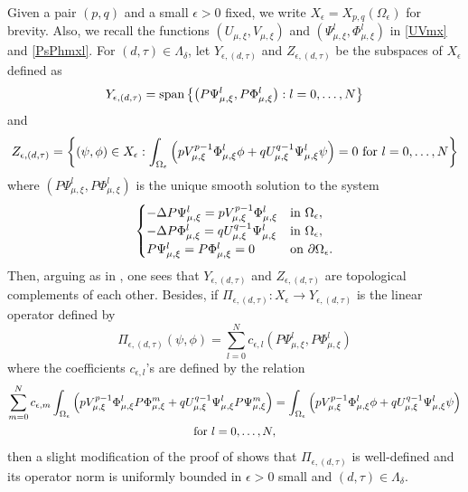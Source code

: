 \documentclass[reqno]{amsart}
\theoremstyle{remark}
\newcommand{\pa}{\partial}
\newcommand{\ep}{\epsilon}
\newcommand{\mx}{{\mu,\xi}}
\renewcommand{\(}{\left(}
\renewcommand{\)}{\right)}
\numberwithin{equation}{section}
\begin{document}
Given a pair $(p,q)$ and a small $\ep > 0$ fixed, we write $X_\ep = X_{p,q}(\Omega_{\ep})$ for brevity.
Also, we recall the functions $(U_\mx,V_\mx)$ and $(\Psi_\mx^l,\Phi_\mx^l)$ in \eqref{UVmx} and \eqref{PsPhmxl}.
For $(d,\tau) \in \Lambda_\delta$, let $Y_{\ep,(d,\tau)}$ and $Z_{\ep,(d,\tau)}$ be the subspaces of $X_\ep$ defined as
\[Y_{\ep,(d,\tau)} = \textup{span} \left\{\(P\Psi_\mx^l,P\Phi_\mx^l\): l = 0, \ldots, N \right\}\]
and
\[Z_{\ep,(d,\tau)} = \left\{(\psi,\phi) \in X_\ep: \int_{\Omega_\ep} \(p V_\mx^{p-1} \Phi_\mx^l \phi + q U_\mx^{q-1} \Psi_\mx^l \psi\) = 0 \textup{ for } l = 0, \ldots, N \right\}\]
where $(P\Psi_\mx^l,P\Phi_\mx^l)$ is the unique smooth solution to the system
\begin{equation}\label{PPsPPhmxl eq}
\begin{cases}
-\Delta P\Psi_\mx^l = pV_\mx^{p-1}\Phi_\mx^l &\textup{in } \Omega_\ep,\\
-\Delta P\Phi_\mx^l = qU_\mx^{q-1}\Psi_\mx^l &\textup{in } \Omega_\ep,\\
P\Psi_\mx^l = P\Phi_\mx^l = 0 &\textup{on } \pa \Omega_\ep.
\end{cases}
\end{equation}
Then, arguing as in \cite[Lemma 3.1]{KP}, one sees that $Y_{\ep,(d,\tau)}$ and $Z_{\ep,(d,\tau)}$ are topological complements of each other.
Besides, if $\Pi_{\ep,(d,\tau)}: X_\ep \to Y_{\ep,(d,\tau)}$ is the linear operator defined by
\begin{equation}\label{Pi}
\Pi_{\ep,(d,\tau)}(\psi,\phi) = \sum_{l=0}^N c_{\ep,l} \(P\Psi_\mx^l,P\Phi_\mx^l\)
\end{equation}
where the coefficients $c_{\ep,l}$'s are defined by the relation
\begin{multline*}
\sum_{m=0}^N c_{\ep,m} \int_{\Omega_\ep} \(p V_\mx^{p-1}\Phi_\mx^l P\Phi_\mx^m + q U_\mx^{q-1} \Psi_\mx^l P\Psi_\mx^m\)
= \int_{\Omega_\ep} \(p V_\mx^{p-1} \Phi_\mx^l \phi + q U_\mx^{q-1} \Psi_\mx^l \psi\) \\
\textup{for } l = 0, \ldots, N,
\end{multline*}
then a slight modification of the proof of \cite[Corollary 3.2]{KP} shows that $\Pi_{\ep,(d,\tau)}$ is well-defined and its operator norm is uniformly bounded in $\ep > 0$ small and $(d,\tau) \in \Lambda_\delta$.
\end{document}
